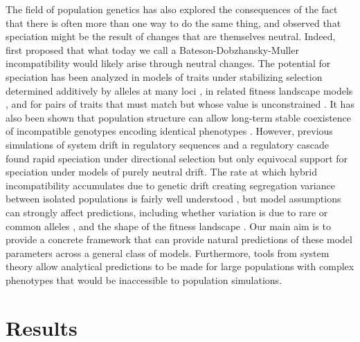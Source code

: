 \documentclass{article}
\newcommand{\1}{\mathbbm{1}}
\begin{document}
The field of population genetics has also explored the consequences of the fact
that there is often more than one way to do the same thing, 
and observed that speciation might be the result of changes that are themselves neutral.
Indeed, \citet{bateson1909heredity} first proposed that what today we call a
Bateson-Dobzhansky-Muller incompatibility would likely arise through neutral changes. 
The potential for speciation has been analyzed in models of 
traits under stabilizing selection determined additively by alleles at many loci 
\citep{wright1935evolution,barton1986maintenance,barton1989divergence,barton2001role},
in related fitness landscape models \citep{fraisse2016genetics},
and for pairs of traits that must match but whose value is unconstrained \citep{sved1981twosex}.
It has also been shown that population structure
can allow long-term stable coexistence of incompatible genotypes encoding identical phenotypes \citep{phillips1996maintenance}. 
However, previous simulations of system drift in regulatory sequences \citep{tulchinsky2014hybrid}
and a regulatory cascade \citep{porter2002speciation}
found rapid speciation under directional selection
but only equivocal support for speciation under models of purely neutral drift.
The rate at which hybrid incompatibility accumulates due to genetic drift creating
segregation variance between isolated populations is fairly well understood
\citep{slatkin1994segregation,rosas2010cryptic,chevin2014niche},
but model assumptions can strongly affect predictions,
including whether variation is due to rare or common alleles \citep{slatkin1994segregation},
and the shape of the fitness landscape \citep{fraisse2016genetics}.
Our main aim is to provide a concrete framework 
that can provide natural predictions of these model parameters
across a general class of models.
Furthermore, tools from system theory allow analytical predictions to be made
for large populations with complex phenotypes
that would be inaccessible to population simulations.


\section*{Results}
\end{document}
